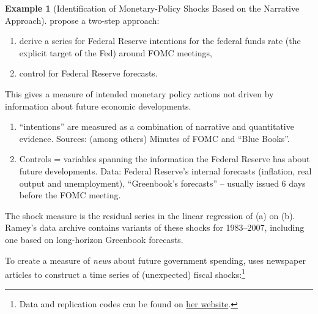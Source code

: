 \documentclass[
  11pt,
]{book}
\providecommand{\tightlist}{%
  \setlength{\itemsep}{0pt}\setlength{\parskip}{0pt}}
\theoremstyle{definition}
\theoremstyle{definition}
\newtheorem{example}{Example}[chapter]
\theoremstyle{definition}
\theoremstyle{definition}
\theoremstyle{remark}
\begin{document}
\begin{example}[Identification of Monetary-Policy Shocks Based on the Narrative Approach]
\protect\hypertarget{exm:RomerRomer}{}\label{exm:RomerRomer}\citet{Romer_Romer_2004} propose a two-step approach:

\begin{enumerate}
\def\labelenumi{\alph{enumi}.}
\tightlist
\item
  derive a series for Federal Reserve intentions for the federal funds rate (the explicit target of the Fed) around FOMC meetings,
\item
  control for Federal Reserve forecasts.
\end{enumerate}

This gives a measure of intended monetary policy actions not driven by information about future economic developments.

\begin{enumerate}
\def\labelenumi{\alph{enumi}.}
\tightlist
\item
  ``intentions'' are measured as a combination of narrative and quantitative evidence. Sources: (among others) Minutes of FOMC and ``Blue Books''.
\item
  Controls = variables spanning the information the Federal Reserve has about future developments. Data: Federal Reserve's internal forecasts (inflation, real output and unemployment), ``Greenbook's forecasts'' -- usually issued 6 days before the FOMC meeting.
\end{enumerate}

The shock measure is the residual series in the linear regression of (a) on (b). Ramey's data archive contains variants of these shocks for 1983--2007, including one based on long-horizon Greenbook forecasts.
\end{example}

To create a measure of \emph{news} about future government spending, \citet{Ramey_2011} uses newspaper articles to construct a time series of (unexpected) fiscal shocks:\footnote{Data and replication codes can be found on \href{https://econweb.ucsd.edu/~vramey/research.html\#govt}{her website}.}
\end{document}
